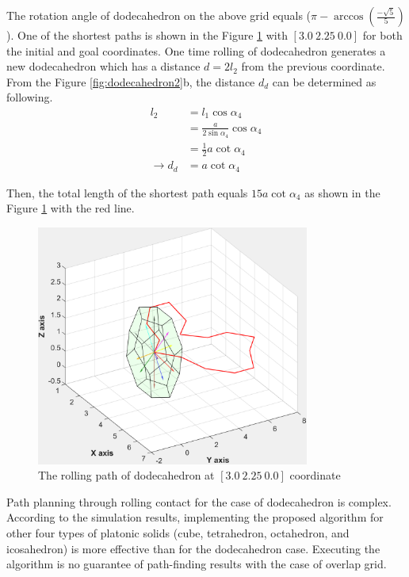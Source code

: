 \noindent The rotation angle of dodecahedron on the above grid equals 
($\pi-\arccos{(\frac{-\sqrt{5}}{5})}$). 
One of the shortest paths is shown in the Figure \ref{fig:dodecaPath1} with $[3.0\ 2.25\ 0.0]$ for both the initial and goal coordinates.
One time rolling of dodecahedron generates a new dodecahedron which has a distance $d=2l_2$ from the previous coordinate. 
From the Figure \ref{fig:dodecahedron2}b, the distance $d_d$ can be determined as following.
\begin{equation*} 
\label{dodeca:eq4}
\begin{split}
l_2 & = l_1\cos{\alpha_4}\\
    & = \frac{a}{2\sin{\alpha_4}}\cos{\alpha_4}\\
    & = \frac{1}{2}a\cot{\alpha_4}\\
\rightarrow d_d & = a\cot{\alpha_4}
\end{split}
\end{equation*}

\noindent Then, the total length of the shortest path equals $15a\cot{\alpha_4}$ as shown in the Figure \ref{fig:dodecaPath1} with the red line.\\
\begin{figure}[h]
\centering
	\includegraphics[width=0.8\textwidth]{image/dodecaPath1.pdf}
	\caption{The rolling path of dodecahedron at $[3.0\ 2.25\ 0.0]$ coordinate}
	\label{fig:dodecaPath1}
\end{figure}

\noindent Path planning through rolling contact for the case of dodecahedron is complex. According to the simulation results, implementing the proposed algorithm for other four types of platonic solids (cube, tetrahedron, octahedron, and icosahedron) is more effective than for the dodecahedron case.  Executing the algorithm is no guarantee of path-finding results with the case of overlap grid.
